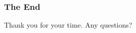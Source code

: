\documentclass{beamer}
\begin{document}
\begin{frame}
\frametitle{The End}
\alert{Thank you} for your time.
Any questions?
\end{frame}



\end{document}
